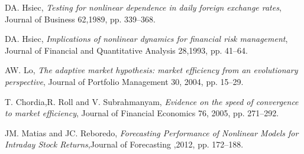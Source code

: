 \begin{thebibliography}{9}
DA. Hsiec, \textit{Testing for nonlinear dependence in daily foreign exchange rates}, Journal of Business 62,1989, pp. 339–368.

DA. Hsiec, \textit{Implications of nonlinear dynamics for financial risk management}, Journal of Financial and Quantitative Analysis 28,1993, pp. 41–64.

AW. Lo, \textit{The adaptive market hypothesis: market efficiency from an evolutionary perspective}, Journal of
Portfolio Management 30, 2004, pp. 15–29.


T. Chordia,R. Roll and V. Subrahmanyam, \textit{Evidence on the speed of convergence to market efficiency}, Journal of
Financial Economics 76, 2005, pp. 271–292.

JM. Matias and JC. Reboredo, \textit{Forecasting Performance of Nonlinear Models for Intraday Stock Returns},Journal of Forecasting ,2012, pp. 172–188. 
\end{thebibliography}